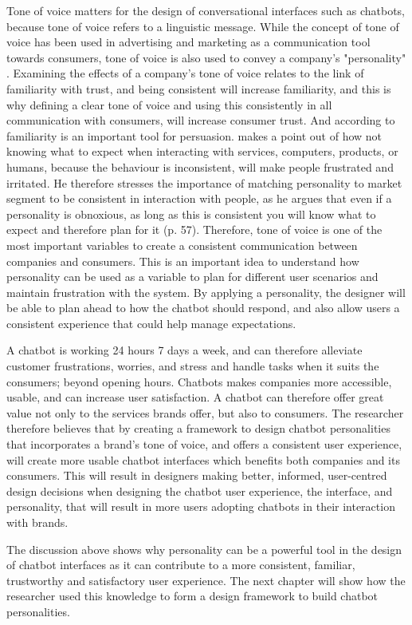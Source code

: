Tone of voice matters for the design of conversational interfaces such as chatbots, because tone of voice refers to a linguistic message. While the concept of tone of voice has been used in advertising and marketing as a communication tool towards consumers, tone of voice is also used to convey a company's "personality" \citep[: 2]{delin2005}. Examining the effects of a company's tone of voice relates to the link of familiarity with trust, and being consistent will increase familiarity, and this is why defining a clear tone of voice and using this consistently in all communication with consumers, will increase consumer trust. And according to \cite{cialdini2007} familiarity is an important tool for persuasion. \cite{Norman2007} makes a point out of how not knowing what to expect when interacting with services, computers, products, or humans, because the behaviour is inconsistent, will make people frustrated and irritated. He therefore stresses the importance of matching personality to market segment to be consistent in interaction with people, as he argues that even if a personality is obnoxious, as long as this is consistent you will know what to expect and therefore plan for it (p. 57). Therefore, tone of voice is one of the most important variables to create a consistent communication between companies and consumers. This is an important idea to understand how personality can be used as a variable to plan for different user scenarios and maintain frustration with the system. By applying a personality, the designer will be able to plan ahead to how the chatbot should respond, and also allow users a consistent experience that could help manage expectations.

A chatbot is working 24 hours 7 days a week, and can therefore alleviate customer frustrations, worries, and stress and handle tasks when it suits the consumers; beyond opening hours. Chatbots makes companies more accessible, usable, and can increase user satisfaction. A chatbot can therefore offer great value not only to the services brands offer, but also to consumers. The researcher therefore believes that by creating a framework to design chatbot personalities that incorporates a brand's tone of voice, and offers a consistent user experience, will create more usable chatbot interfaces which benefits both companies and its consumers. This will result in designers making better, informed, user-centred design decisions when designing the chatbot user experience, the interface, and personality, that will result in more users adopting chatbots in their interaction with brands.

\vspace{5mm}

The discussion above shows why personality can be a powerful tool in the design of chatbot interfaces as it can contribute to a more consistent, familiar, trustworthy and satisfactory user experience. The next chapter will show how the researcher used this knowledge to form a design framework to build chatbot personalities.






